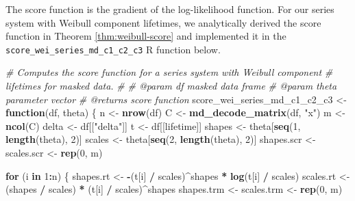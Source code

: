 \documentclass[
]{article}
\newenvironment{Shaded}{\begin{snugshade}}{\end{snugshade}}
\newcommand{\CommentTok}[1]{\textcolor[rgb]{0.56,0.35,0.01}{\textit{#1}}}
\newcommand{\ControlFlowTok}[1]{\textcolor[rgb]{0.13,0.29,0.53}{\textbf{#1}}}
\newcommand{\DecValTok}[1]{\textcolor[rgb]{0.00,0.00,0.81}{#1}}
\newcommand{\KeywordTok}[1]{\textcolor[rgb]{0.13,0.29,0.53}{\textbf{#1}}}
\newcommand{\NormalTok}[1]{#1}
\newcommand{\OperatorTok}[1]{\textcolor[rgb]{0.81,0.36,0.00}{\textbf{#1}}}
\newcommand{\StringTok}[1]{\textcolor[rgb]{0.31,0.60,0.02}{#1}}
\theoremstyle{definition}
\theoremstyle{plain}
\theoremstyle{definition}
\theoremstyle{definition}
\theoremstyle{definition}
\theoremstyle{definition}
\theoremstyle{remark}
\begin{document}
The score function is the gradient of the log-likelihood function. For our
series system with Weibull component lifetimes, we analytically derived the
score function in Theorem \ref{thm:weibull-score} and implemented it in
the \texttt{score\_wei\_series\_md\_c1\_c2\_c3} R function below.

\begin{Shaded}
\begin{Highlighting}[]
\CommentTok{\#\textquotesingle{} Computes the score function for a series system with Weibull component}
\CommentTok{\#\textquotesingle{} lifetimes for masked data.}
\CommentTok{\#\textquotesingle{}}
\CommentTok{\#\textquotesingle{} @param df masked data frame}
\CommentTok{\#\textquotesingle{} @param theta parameter vector}
\CommentTok{\#\textquotesingle{} @returns score function}
\NormalTok{score\_wei\_series\_md\_c1\_c2\_c3 \textless{}{-}}\StringTok{ }\ControlFlowTok{function}\NormalTok{(df, theta) \{}
\NormalTok{  n \textless{}{-}}\StringTok{ }\KeywordTok{nrow}\NormalTok{(df)}
\NormalTok{  C \textless{}{-}}\StringTok{ }\KeywordTok{md\_decode\_matrix}\NormalTok{(df, }\StringTok{"x"}\NormalTok{)}
\NormalTok{  m \textless{}{-}}\StringTok{ }\KeywordTok{ncol}\NormalTok{(C)}
\NormalTok{  delta \textless{}{-}}\StringTok{ }\NormalTok{df[[}\StringTok{"delta"}\NormalTok{]]}
\NormalTok{  t \textless{}{-}}\StringTok{ }\NormalTok{df[[lifetime]]}
\NormalTok{  shapes \textless{}{-}}\StringTok{ }\NormalTok{theta[}\KeywordTok{seq}\NormalTok{(}\DecValTok{1}\NormalTok{, }\KeywordTok{length}\NormalTok{(theta), }\DecValTok{2}\NormalTok{)]}
\NormalTok{  scales \textless{}{-}}\StringTok{ }\NormalTok{theta[}\KeywordTok{seq}\NormalTok{(}\DecValTok{2}\NormalTok{, }\KeywordTok{length}\NormalTok{(theta), }\DecValTok{2}\NormalTok{)]}
\NormalTok{  shapes.scr \textless{}{-}}\StringTok{ }\NormalTok{scales.scr \textless{}{-}}\StringTok{ }\KeywordTok{rep}\NormalTok{(}\DecValTok{0}\NormalTok{, m)}

  \ControlFlowTok{for}\NormalTok{ (i }\ControlFlowTok{in} \DecValTok{1}\OperatorTok{:}\NormalTok{n) \{}
\NormalTok{    shapes.rt \textless{}{-}}\StringTok{ }\OperatorTok{{-}}\NormalTok{(t[i] }\OperatorTok{/}\StringTok{ }\NormalTok{scales)}\OperatorTok{\^{}}\NormalTok{shapes }\OperatorTok{*}\StringTok{ }\KeywordTok{log}\NormalTok{(t[i] }\OperatorTok{/}\StringTok{ }\NormalTok{scales)}
\NormalTok{    scales.rt \textless{}{-}}\StringTok{ }\NormalTok{(shapes }\OperatorTok{/}\StringTok{ }\NormalTok{scales) }\OperatorTok{*}\StringTok{ }\NormalTok{(t[i] }\OperatorTok{/}\StringTok{ }\NormalTok{scales)}\OperatorTok{\^{}}\NormalTok{shapes}
\NormalTok{    shapes.trm \textless{}{-}}\StringTok{ }\NormalTok{scales.trm \textless{}{-}}\StringTok{ }\KeywordTok{rep}\NormalTok{(}\DecValTok{0}\NormalTok{, m)}


\end{Highlighting}
\end{Shaded}
\end{document}
